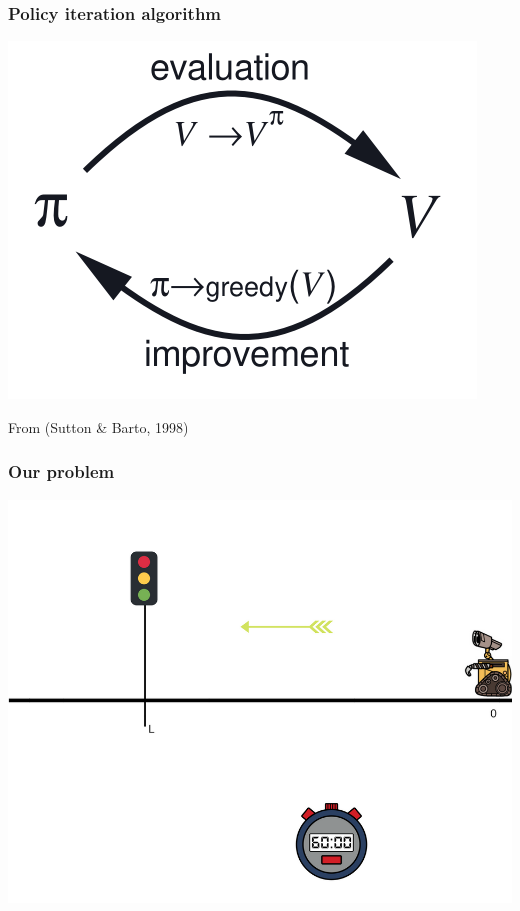 \documentclass[dvipsnames,svgnames]{beamer}
\begin{document}
\begin{frame}
\frametitle{Policy iteration algorithm}
\centering
\includegraphics[scale=0.7]{img/policy_iter_sutton.png}

From (Sutton \& Barto, 1998)
\end{frame}


\begin{frame}
\frametitle{Our problem}
\begin{center}
\includegraphics[scale=0.4]{img/illustration_traffic_light.png}
\end{center}
\end{frame}
\end{document}
